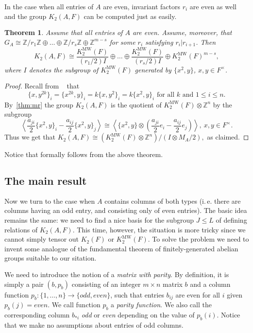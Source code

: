 \documentclass[oneside, 10pt]{amsart}
\theoremstyle{plain}
\newtheorem{thm}{Theorem}
\theoremstyle{remark}
\theoremstyle{definition}
\newcommand{\ZZ}{\mathbb{Z}}
\newcommand{\K}{K_2}
\newcommand{\Kmw}{K^{\mathrm{MW}}_2}
\begin{document}
In the case when all entries of $A$ are even, invariant factors $r_i$ are even as well and the group $\K(A, F)$ can be computed just as easily.
\begin{thm} \label{thm-even}
  Assume that all entries of $A$ are even.
  Assume, moreover, that $G_A \cong \ZZ / r_1 \ZZ \oplus \ldots \oplus \ZZ / r_s\ZZ \oplus \ZZ^{m-s}$ for some $r_i$ satisfying $r_i | r_{i+1}$.
  Then
   \[\K(A, F) \cong \frac{\Kmw(F)}{(r_1/2) I} \oplus \ldots \oplus \frac{\Kmw(F)}{(r_s/2) I} \oplus \Kmw(F)^{m-s}, \]
    where $I$ denotes the subgroup of $\Kmw(F)$ generated by $\{x^2, y\}$, $x, y\in F^\times$.
\end{thm}
\begin{proof}
 Recall from ~\cite[Lemma~3.2]{MW} that
 \[\{x, y^{2k}\}_i = \{x^{2k}, y\}_i = k\{x,y^2\}_i = k\{x^2, y\}_i \text{ for all } k\text{ and } 1\leq i\leq n.\]
 By~\cref{thm:mr} the group $\K(A, F)$ is the quotient of
  $\Kmw(F) \otimes \ZZ^n$ by the subgroup 
  \[\left\langle \frac{a_{ji}}{2}\{x^2, y\}_i - \frac{a_{ij}}{2}\{x^2, y\}_j \right\rangle \cong \left\langle 
   \{x^2, y\} \otimes \left(\frac{a_{ji}}{2} e_i - \frac{a_{ij}}{2} e_j\right)\right\rangle,\ x,y\in F^\times. \]
 Thus we get that $\K(A, F) \cong \left(\Kmw(F) \otimes \ZZ^n\right) / (I \otimes M_A/2),$ as claimed. 
\end{proof}
Notice that \cite[Theorem~6.1]{MW} formally follows from the above theorem.

\subsection{The main result}
Now we turn to the case when $A$ contains columns of both types 
(i.\,e. there are columns having an odd entry, and consisting only of even entries).
The basic idea remains the same: we need to find a nice basis for the subgroup $J\leq L$ of defining relations of $\K(A, F)$.
This time, however, the situation is more tricky since we cannot simply tensor out $\K(F)$ or $\Kmw(F)$.
To solve the problem we need to invent some analogue of the fundamental theorem of finitely-generated abelian groups suitable to our sitation.

We need to introduce the notion of a {\it matrix with parity}.
By definition, it is simply a pair $(b, p_b)$ consisting of an integer $m\times n$ matrix $b$ and a column function $p_b\colon \{1,\ldots,n\}\to \{odd, even\}$,
 such that entries $b_{ij}$ are even for all $i$ given $p_b(j)=even$.
We call function $p_b$ a {\it parity function}.
We also call the corresponding column $b_{*i}$ {\it odd} or {\it even} depending on the value of $p_b(i)$.
Notice that we make no assumptions about entries of odd columns.
\end{document}
